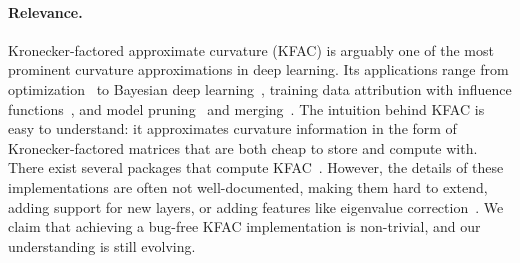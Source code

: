 \paragraph{Relevance.} Kronecker-factored approximate curvature (KFAC) is arguably one of the most prominent curvature approximations in deep learning.
Its applications range from optimization~\cite{martens2015optimizing,grosse2016kroneckerfactored,eschenhagen2023kroneckerfactored,benzing2022gradient,petersen2023isaac} to Bayesian deep learning~\cite{daxberger2021laplace}, training data attribution with influence functions~\cite{grosse2023studying,bae2024training}, and model pruning~\cite{wang2019eigendamage} and merging~\cite{tam2024merging}.
The intuition behind KFAC is easy to understand: it approximates curvature information in the form of Kronecker-factored matrices that are both cheap to store and compute with.
There exist several packages that compute KFAC~\cite{botev2022kfac-jax,dangel2020backpack,osawa2023asdl}.
However, the details of these implementations are often not well-documented, making them hard to extend, \eg\,adding support for new layers, or adding features like eigenvalue correction~\cite{george2018fast}.
We claim that achieving a bug-free KFAC implementation is non-trivial, and our understanding is still evolving.

